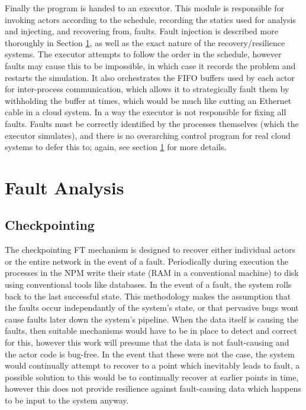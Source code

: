 Finally the program is handed to an executor.
This module is responsible for invoking actors according to the schedule, recording the statics used for analysis and injecting, and recovering from, faults.
Fault injection is described more thoroughly in Section \ref{secSystemFault}, as well as the exact nature of the recovery/resilience systems.
The executor attempts to follow the order in the schedule, however faults may cause this to be impossible, in which case it records the problem and restarts the simulation.
It also orchestrates the FIFO buffers used by each actor for inter-process communication, which allows it to strategically fault them by withholding the buffer at times, which would be much like cutting an Ethernet cable in a cloud system.
In a way the executor is not responsible for fixing all faults.
Faults must be correctly identified by the processes themselves (which the executor simulates), and there is no overarching control program for real cloud systems to defer this to; again, see section \ref{secSystemFault} for more details.

\section{Fault Analysis}
\label{secSystemFault}
\subsection{Checkpointing}

The checkpointing FT mechanism is designed to recover either individual actors or the entire network in the event of a fault.
Periodically during execution the processes in the NPM write their state (RAM in a conventional machine) to disk using conventional tools like databases.
In the event of a fault, the system rolls back to the last successful state.
This methodology makes the assumption that the faults occur independantly of the system's state, or that pervasive bugs wont cause faults later down the system's pipeline.
When the data itself is causing the faults, then suitable mechanisms would have to be in place to detect and correct for this, however this work will presume that the data is not fault-causing and the actor code is bug-free.
In the event that these were not the case, the system would continually attempt to recover to a point which inevitably leads to fault, a possible solution to this would be to continually recover at earlier points in time, however this does not provide resilience against fault-causing data which happens to be input to the system anyway.

